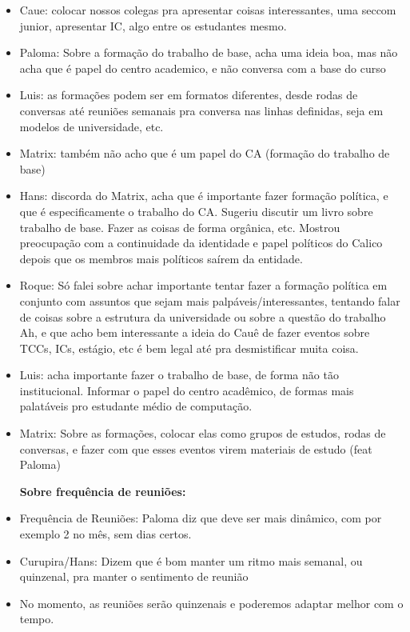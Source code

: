 \documentclass{ata-calico}
\begin{document}
\begin{itemize}
\item Caue: colocar nossos colegas pra apresentar coisas interessantes, uma seccom junior, 
apresentar IC, algo entre os estudantes mesmo.

\item Paloma: Sobre a formação do trabalho de base, acha uma ideia boa, mas não acha que é papel do centro academico, e não conversa com a base do curso


\item Luis: as formações podem ser em formatos diferentes, desde rodas de conversas até reuniões semanais pra conversa nas linhas definidas, seja em modelos de universidade, etc.

\item Matrix: também não acho que é um papel do CA (formação do trabalho de base)

\item Hans: discorda do Matrix, acha que é importante fazer formação política, e que é especificamente o trabalho do CA.
Sugeriu discutir um livro sobre trabalho de base. Fazer as coisas de forma orgânica, etc. Mostrou preocupação com a continuidade da identidade e papel políticos do Calico depois que os membros mais políticos saírem da entidade.

\item Roque: Só falei sobre achar importante tentar fazer a formação política em conjunto com assuntos que sejam mais 
palpáveis/interessantes, tentando falar de coisas sobre a estrutura da universidade ou sobre a questão do trabalho
Ah, e que acho bem interessante a ideia do Cauê de fazer eventos sobre TCCs, ICs, estágio, etc é bem legal até 
pra desmistificar muita coisa.

\item Luis: acha importante fazer o trabalho de base, de forma não tão institucional. Informar o papel do centro acadêmico, de formas mais palatáveis pro estudante médio de computação.

\item Matrix: Sobre as formações, colocar elas como grupos de estudos, rodas de conversas, e fazer com que esses eventos virem materiais de estudo (feat Paloma)

\textbf{Sobre frequência de reuniões:}
\item Frequência de Reuniões: Paloma diz que deve ser mais dinâmico, com por exemplo 2 no mês, sem dias certos.

\item Curupira/Hans: Dizem que é bom manter um ritmo mais semanal, ou quinzenal, pra manter o sentimento de reunião

\item No momento, as reuniões serão quinzenais e poderemos adaptar melhor com o tempo.

\end{itemize}

\end{document}
